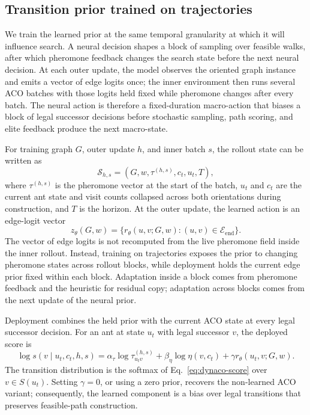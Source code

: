 \documentclass[11pt]{article}
\begin{document}
\subsection{Transition prior trained on trajectories}

We train the learned prior at the same temporal granularity at which it will influence search. A neural decision shapes a block of sampling over feasible walks, after which pheromone feedback changes the search state before the next neural decision. At each outer update, the model observes the oriented graph instance and emits a vector of edge logits once; the inner environment then runs several ACO batches with those logits held fixed while pheromone changes after every batch. The neural action is therefore a fixed-duration macro-action that biases a block of legal successor decisions before stochastic sampling, path scoring, and elite feedback produce the next macro-state.

For training graph $G$, outer update $h$, and inner batch $s$, the rollout state can be written as
\begin{equation}
\mathcal S_{h,s}=(G,w,\tau^{(h,s)},c_t,u_t,T),
\end{equation}
where $\tau^{(h,s)}$ is the pheromone vector at the start of the batch, $u_t$ and $c_t$ are the current ant state and visit counts collapsed across both orientations during construction, and $T$ is the horizon. At the outer update, the learned action is an edge-logit vector
\begin{equation}
z_\theta(G,w)=\{r_\theta(u,v;G,w):(u,v)\in\mathcal E_{\mathrm{end}}\}.
\end{equation}
The vector of edge logits is not recomputed from the live pheromone field inside the inner rollout. Instead, training on trajectories exposes the prior to changing pheromone states across rollout blocks, while deployment holds the current edge prior fixed within each block. Adaptation inside a block comes from pheromone feedback and the heuristic for residual copy; adaptation across blocks comes from the next update of the neural prior.

Deployment combines the held prior with the current ACO state at every legal successor decision. For an ant at state $u_t$ with legal successor $v$, the deployed score is
\begin{equation}
\log s(v\mid u_t,c_t,h,s)
=
\alpha_\tau\log \tau^{(h,s)}_{u_tv}
+\beta_\eta\log \eta(v,c_t)
+\gamma r_\theta(u_t,v;G,w).
\label{eq:dynaco-score}
\end{equation}
The transition distribution is the softmax of Eq.~\eqref{eq:dynaco-score} over $v\in S(u_t)$. Setting $\gamma=0$, or using a zero prior, recovers the non-learned ACO variant; consequently, the learned component is a bias over legal transitions that preserves feasible-path construction.
\end{document}
